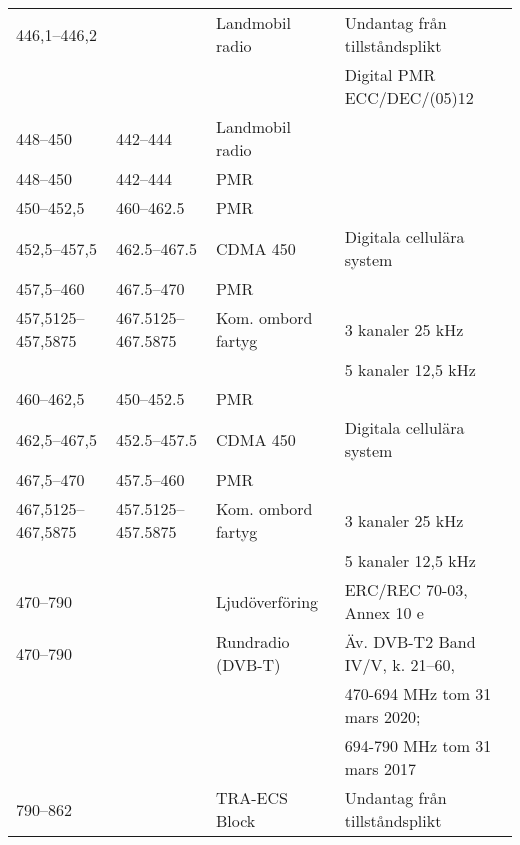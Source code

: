 \documentclass[10pt,swedish,a4paper,twoside]{article}
\begin{document}
\begin{landscape}
\begin{longtable}{llll}
	446,1--446,2       &                    & Landmobil radio         & Undantag från tillståndsplikt            \\
	                   &                    &                         & Digital PMR ECC/DEC/(05)12               \\
	448--450           & 442--444           & Landmobil radio         &  \\
	448--450           & 442--444           & PMR                     &  \\
	450--452,5         & 460--462.5         & PMR                     &  \\
	452,5--457,5       & 462.5--467.5       & CDMA 450                & Digitala cellulära system                \\
	457,5--460         & 467.5--470         & PMR                     &  \\
	457,5125--457,5875 & 467.5125--467.5875 & Kom. ombord fartyg      & 3 kanaler 25 kHz                         \\
	                   &                    &                         & 5 kanaler 12,5 kHz                       \\
	460--462,5         & 450--452.5         & PMR                     &  \\
	462,5--467,5       & 452.5--457.5       & CDMA 450                & Digitala cellulära system                \\
	467,5--470         & 457.5--460         & PMR                     &  \\
	467,5125--467,5875 & 457.5125--457.5875 & Kom. ombord  fartyg     & 3 kanaler 25 kHz                         \\
	                   &                    &                         & 5 kanaler 12,5 kHz                       \\
	470--790           &                    & Ljudöverföring          & ERC/REC 70-03, Annex 10 e                \\
	470--790           &                    & Rundradio (DVB-T)       & Äv. DVB-T2 Band IV/V, k. 21--60,         \\
	                   &                    &                         & 470-694 MHz tom 31 mars 2020;            \\
	                   &                    &                         & 694-790 MHz tom 31 mars 2017             \\
	790--862           &                    & TRA-ECS	Block           & Undantag från tillståndsplikt            \\

\end{longtable}
\end{landscape}
\end{document}
